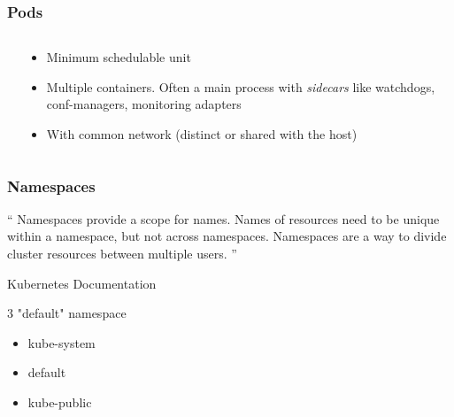 \documentclass{beamer}
\begin{document}
\begin{frame}
  \frametitle{Pods}
  \begin{columns}
  \begin{column}{0.5\textwidth}
    \begin{center}
    \end{center}
  \end{column}
  \begin{column}{0.5\textwidth}
    \begin{itemize}
      \item<1-> Minimum schedulable unit
      \item<2-> Multiple containers. Often a main process with \textit{sidecars}
        like watchdogs, conf-managers, monitoring adapters
      \item<3-> With common network (distinct or shared with the host)
    \end{itemize}
  \end{column}
  \end{columns}
\end{frame}

\begin{frame}
  \frametitle{Namespaces}
  \enquote{
    Namespaces provide a scope for names. Names of resources need to be unique within a namespace, but not across namespaces.
    \newline
    Namespaces are a way to divide cluster resources between multiple users.
  }
  \newline

  \hfill Kubernetes Documentation

  \vfill
  \scriptsize{
    \begin{block}{3 "default" namespace}
    \begin{itemize}
      \item kube-system
      \item default
      \item kube-public
    \end{itemize}
    \end{block}
  }
\end{frame}
\end{document}
